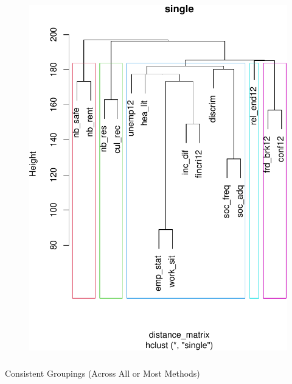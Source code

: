 \documentclass[
]{article}
\makeatletter
\let\oldsubparagraph\subparagraph
\renewcommand{\subparagraph}{
    \@ifstar
      \xxxSubParagraphStar
      \xxxSubParagraphNoStar
  }
\newcommand{\xxxSubParagraphStar}[1]{\oldsubparagraph*{#1}\mbox{}}
\newcommand{\xxxSubParagraphNoStar}[1]{\oldsubparagraph{#1}\mbox{}}
\makeatother
\begin{document}
\begin{figure}
\begin{minipage}{0.50\linewidth}
\begin{center}
\includegraphics{draft_v2_files/figure-pdf/unnamed-chunk-19-4.pdf}
\end{center}
\end{minipage}%

\end{figure}%

\subparagraph{Consistent Groupings (Across All or Most
Methods)}\label{consistent-groupings-across-all-or-most-methods}
\end{document}
